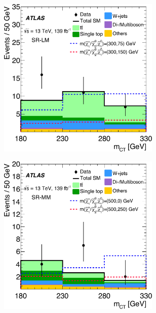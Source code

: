  \begin{figure}
	\centering
	\begin{subfigure}[b]{0.5\linewidth}
		\centering\includegraphics[width=0.85\textwidth]{OneLepton_Wh_SRLMEM_mct2_yellow}
	\end{subfigure}\hfill
	\begin{subfigure}[b]{0.5\linewidth}
		\centering\includegraphics[width=0.85\textwidth]{OneLepton_Wh_SRMMEM_mct2_yellow}
	\end{subfigure}\hfill
	\begin{subfigure}[b]{0.5\linewidth}

\end{subfigure}
\end{figure}
